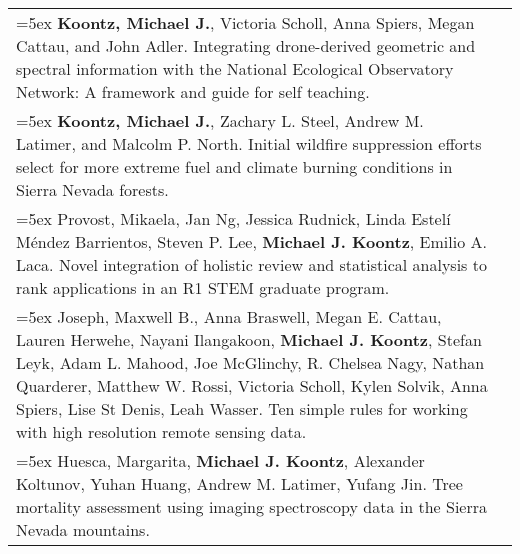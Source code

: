 \begin{longtable}{@{} >{\raggedright}p{5.25in} >{\raggedleft}X @{}}

\hangindent=5ex \textbf{Koontz, Michael J.}, Victoria Scholl, Anna Spiers, Megan Cattau, and John Adler. Integrating drone-derived geometric and spectral information with the National Ecological Observatory Network: A framework and guide for self teaching. & [\textcolor{blue}{\href{https://github.com/mikoontz/neon-drone-workflow}{GitHub}}] \tabularnewline

\hangindent=5ex \textbf{Koontz, Michael J.}, Zachary L. Steel, Andrew M. Latimer, and Malcolm P. North. Initial wildfire suppression efforts select for more extreme fuel and climate burning conditions in Sierra Nevada forests.  & [\textcolor{blue}{\href{https://github.com/mikoontz/selection-by-suppression}{GitHub}}] \tabularnewline

\hangindent=5ex Provost, Mikaela, Jan Ng, Jessica Rudnick, Linda Estel\'i M\'endez Barrientos, Steven P. Lee, \textbf{Michael J. Koontz}, Emilio A. Laca. Novel integration of holistic review and statistical analysis to rank applications in an R1 STEM graduate program. & \tabularnewline


\hangindent=5ex Joseph, Maxwell B., Anna Braswell, Megan E. Cattau, Lauren Herwehe, Nayani Ilangakoon, \textbf{Michael J. Koontz}, Stefan Leyk, Adam L. Mahood, Joe McGlinchy, R. Chelsea Nagy, Nathan Quarderer, Matthew W. Rossi, Victoria Scholl, Kylen Solvik, Anna Spiers, Lise St Denis, Leah Wasser. Ten simple rules for working with high resolution remote sensing data. & \tabularnewline

\hangindent=5ex Huesca, Margarita, \textbf{Michael J. Koontz}, Alexander Koltunov, Yuhan Huang, Andrew M. Latimer, Yufang Jin. Tree mortality assessment using imaging spectroscopy data in the Sierra Nevada mountains. &

\end{longtable}



